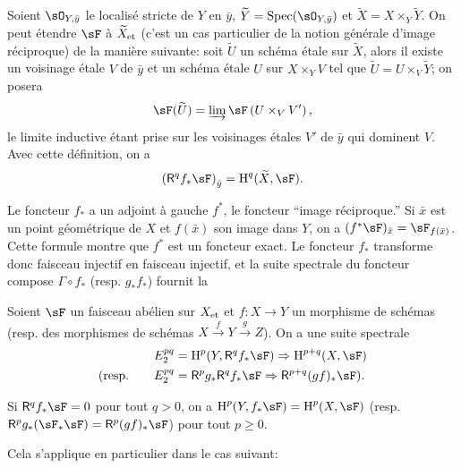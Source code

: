 Soient $\sO_{Y,\bar y}$ le localisé stricte de $Y$ en $\bar y$, 
$\widetilde Y=\spec(\sO_{Y,\bar y})$ et $\widetilde X=X\times_Y \widetilde Y$. 
On peut étendre $\sF$ à ${\widetilde X}_{\textnormal{et}}$ (c'est un cas particulier de la 
notion générale d'image réciproque) de la manière suivante: soit 
$\widetilde U$ un schéma étale sur $\widetilde X$, alors il existe un 
voisinage étale $V$ de $\bar y$ et un schéma étale $U$ sur $X\times_Y V$ tel 
que $\widetilde U=U\times_V \widetilde Y$; on posera 
\[
  \sF(\widetilde U)=\varinjlim \sF\left(U\times_V V'\right)\text{,}
\]
le limite inductive étant prise sur les voisinages étales $V'$ de $\bar y$ qui 
dominent $V$. Avec cette définition, on a 
\[
  \left(\R^q f_* \sF\right)_{\bar y} = \h^q(\widetilde X,\sF)\text{.}
\]

Le foncteur $f_*$ a un adjoint à gauche $f^*$, le foncteur ``image 
réciproque.'' Si $\bar x$ est un point géométrique de $X$ et $f(\bar x)$ son 
image dans $Y$, on a $(f^* \sF)_{\bar x} = \sF_{f(\bar x)}$. Cette formule montre 
que $f^*$ est un foncteur exact. Le foncteur $f_*$ transforme donc faisceau 
injectif en faisceau injectif, et la suite spectrale du foncteur compose 
$\Gamma\circ f_*$ (resp. $g_* f_*$) fournit la 





\begin{theorem}\label{I:2-3-4}
Soient $\sF$ un faisceau abélien sur ${X}_{\textnormal{et}}$ et $f:X\to Y$ un morphisme de 
schémas (resp. des morphismes de schémas $X\xrightarrow f Y \xrightarrow g Z$). 
On a une suite spectrale 
\begin{align*}
  E_2^{pq} &= \h^p(Y,\R^q f_* \sF) \Rightarrow \h^{p+q}(X,\sF) \\
  \text{(resp.}\qquad E_2^{pq} &= \R^p g_* \R^q f_* \sF \Rightarrow \R^{p+q}(gf)_* \sF\text{).}
\end{align*}
\end{theorem}





\begin{corollary}\label{I:2-3-5}
Si $\R^q f_* \sF=0$ pour tout $q>0$, on a $\h^p(Y,f_* \sF)=\h^p(X,\sF)$ (resp. 
$\R^p g_*(\sF_* \sF) = \R^p(g f)_* \sF$) pour tout $p\geqslant 0$. 
\end{corollary}

Cela s'applique en particulier dans le cas suivant:





